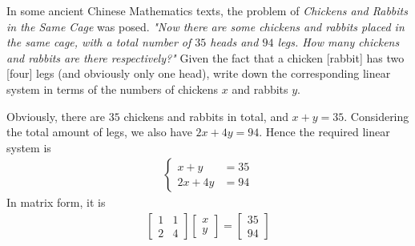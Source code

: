 \begin{Exercise}
\label{ex:animals}
In some ancient Chinese Mathematics texts, the problem of \textit{Chickens and Rabbits in the Same Cage} was posed. \textit{"Now there are some chickens and rabbits placed in the same cage, with a total number of $35$ heads and $94$ legs. How many chickens and rabbits are there respectively?"} Given the fact that a chicken [rabbit] has two [four] legs (and obviously only one head), write down the corresponding linear system in terms of the numbers of chickens $x$ and rabbits $y$.
\end{Exercise}
\begin{Answer}
Obviously, there are $35$ chickens and rabbits in total, and $x + y = 35$. Considering the total amount of legs, we also have $2x + 4y = 94$. Hence the required linear system is
\begin{align*}
\begin{cases}
x + y &= 35\\
2x + 4y &= 94
\end{cases}    
\end{align*}
In matrix form, it is
\begin{align*}
\begin{bmatrix}
1 & 1 \\
2 & 4 
\end{bmatrix}
\begin{bmatrix}
x \\
y
\end{bmatrix}
=
\begin{bmatrix}
35 \\
94
\end{bmatrix}
\end{align*}
\end{Answer}